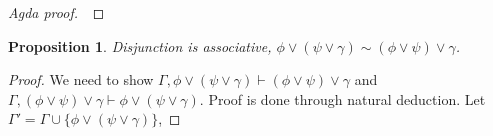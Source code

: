 \documentclass[titlepage]{article}
\newtheorem{proposition}{Proposition}
\begin{document}
\begin{proof}[Agda proof]
    $\:$
\end{proof}

\begin{proposition}
    Disjunction is associative, $\phi \vee (\psi \vee \gamma) \sim (\phi \vee \psi) \vee \gamma$.
\end{proposition}

\begin{proof}
    We need to show $\Gamma, \phi \vee (\psi \vee \gamma) \vdash (\phi \vee \psi) \vee \gamma$ and $\Gamma, (\phi \vee \psi) \vee \gamma \vdash \phi \vee (\psi \vee \gamma)$. Proof is done through natural deduction. Let $\Gamma' = \Gamma \cup \{\phi \vee (\psi \vee \gamma)\}$,
    

\end{proof}
\end{document}
